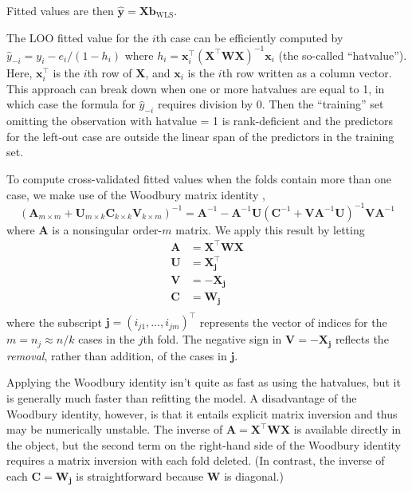 \documentclass[
]{jss}
\begin{document}
Fitted values are then
\(\widehat{\mathbf{y}} = \mathbf{X}\mathbf{b}_{\mathrm{WLS}}\).

The LOO fitted value for the \(i\)th case can be efficiently computed by
\(\widehat{y}_{-i} = y_i - e_i/(1 - h_i)\) where
\(h_i = \mathbf{x}^\top_i \left( \mathbf{X}^\top \mathbf{W} \mathbf{X} \right)^{-1} \mathbf{x}_i\)
(the so-called ``hatvalue''). Here, \(\mathbf{x}^\top_i\) is the \(i\)th
row of \(\mathbf{X}\), and \(\mathbf{x}_i\) is the \(i\)th row written
as a column vector. This approach can break down when one or more
hatvalues are equal to 1, in which case the formula for
\(\widehat{y}_{-i}\) requires division by 0. Then the ``training'' set
omitting the observation with hatvalue = 1 is rank-deficient and the
predictors for the left-out case are outside the linear span of the
predictors in the training set.

To compute cross-validated fitted values when the folds contain more
than one case, we make use of the Woodbury matrix identity
\citep{Hager:1989}, \[
\left(\mathbf{A}_{m \times m} + \mathbf{U}_{m \times k}
\mathbf{C}_{k \times k} \mathbf{V}_{k \times m} \right)^{-1} = \mathbf{A}^{-1} - \mathbf{A}^{-1}\mathbf{U} \left(\mathbf{C}^{-1} +
\mathbf{VA}^{-1}\mathbf{U} \right)^{-1} \mathbf{VA}^{-1}
\] where \(\mathbf{A}\) is a nonsingular order-\(m\) matrix. We apply
this result by letting \begin{align*}
    \mathbf{A} &= \mathbf{X}^\top \mathbf{W} \mathbf{X} \\
    \mathbf{U} &= \mathbf{X}_\mathbf{j}^\top \\
    \mathbf{V} &= - \mathbf{X}_\mathbf{j} \\
    \mathbf{C} &= \mathbf{W}_\mathbf{j} \\
\end{align*} where the subscript
\(\mathbf{j} = (i_{j1}, \ldots, i_{jm})^\top\) represents the vector of
indices for the \(m = n_j \approx n/k\) cases in the \(j\)th fold. The
negative sign in \(\mathbf{V} = - \mathbf{X}_\mathbf{j}\) reflects the
\emph{removal}, rather than addition, of the cases in \(\mathbf{j}\).

Applying the Woodbury identity isn't quite as fast as using the
hatvalues, but it is generally much faster than refitting the model. A
disadvantage of the Woodbury identity, however, is that it entails
explicit matrix inversion and thus may be numerically unstable. The
inverse of \(\mathbf{A} = \mathbf{X}^\top \mathbf{W} \mathbf{X}\) is
available directly in the  object, but the second term on the
right-hand side of the Woodbury identity requires a matrix inversion
with each fold deleted. (In contrast, the inverse of each
\(\mathbf{C} = \mathbf{W}_\mathbf{j}\) is straightforward because
\(\mathbf{W}\) is diagonal.)
\end{document}

